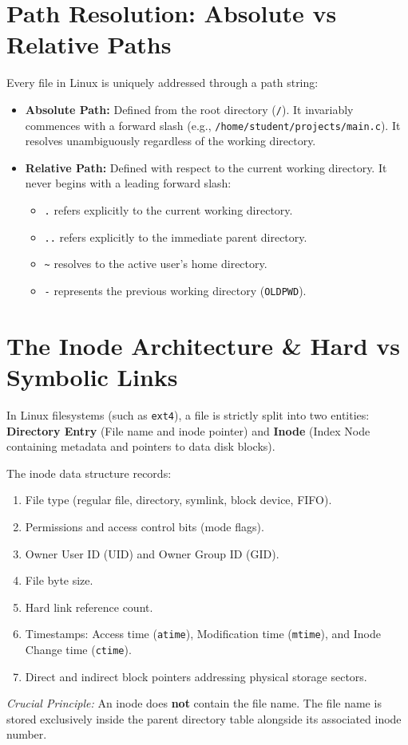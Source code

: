 \section{Path Resolution: Absolute vs Relative Paths}
Every file in Linux is uniquely addressed through a path string:
\begin{itemize}[leftmargin=1.5em]
    \item \textbf{Absolute Path:} Defined from the root directory (\texttt{/}). It invariably commences with a forward slash (e.g., \texttt{/home/student/projects/main.c}). It resolves unambiguously regardless of the working directory.
    \item \textbf{Relative Path:} Defined with respect to the current working directory. It never begins with a leading forward slash:
    \begin{itemize}
        \item \texttt{.} refers explicitly to the current working directory.
        \item \texttt{..} refers explicitly to the immediate parent directory.
        \item \texttt{\textasciitilde} resolves to the active user's home directory.
        \item \texttt{-} represents the previous working directory (\texttt{OLDPWD}).
    \end{itemize}
\end{itemize}

\section{The Inode Architecture \& Hard vs Symbolic Links}
In Linux filesystems (such as \texttt{ext4}), a file is strictly split into two entities: \textbf{Directory Entry} (File name and inode pointer) and \textbf{Inode} (Index Node containing metadata and pointers to data disk blocks).

\begin{definition}
The inode data structure records:
\begin{enumerate}[leftmargin=1.5em]
    \item File type (regular file, directory, symlink, block device, FIFO).
    \item Permissions and access control bits (mode flags).
    \item Owner User ID (UID) and Owner Group ID (GID).
    \item File byte size.
    \item Hard link reference count.
    \item Timestamps: Access time (\texttt{atime}), Modification time (\texttt{mtime}), and Inode Change time (\texttt{ctime}).
    \item Direct and indirect block pointers addressing physical storage sectors.
\end{enumerate}
\textit{Crucial Principle:} An inode does \textbf{not} contain the file name. The file name is stored exclusively inside the parent directory table alongside its associated inode number.
\end{definition}

